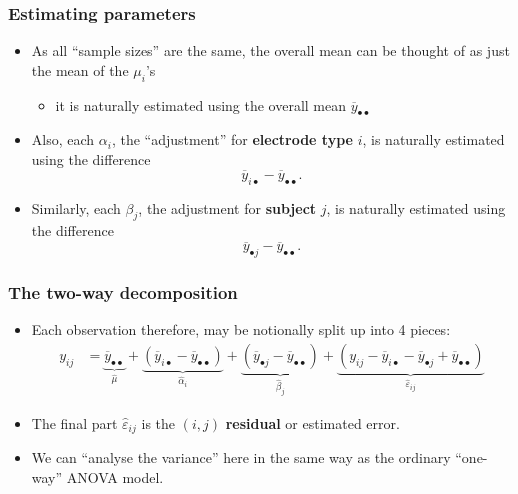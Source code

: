 \documentclass[a4paper]{article}
\begin{document}
\subsubsection{Estimating parameters}
\begin{itemize}
	\item As all ``sample sizes'' are the same, the overall mean can be thought of as just the mean of the \( \mu_i \)'s
	\begin{itemize}
		\item it is naturally estimated using the overall mean \( \overline{y}_{\bullet\bullet} \) 
	\end{itemize}
	\item Also, each \( \alpha_i \), the ``adjustment'' for \textcolor{mygreen}{\textbf{electrode type}} \( i \), is naturally estimated using the difference
	\[
		\overline{y}_{i\bullet} - \overline{y}_{\bullet\bullet}.
	\]
	\item Similarly, each \( \beta_j \), the adjustment for \textcolor{myred}{\textbf{subject}} \( j \), is naturally estimated using the difference
	\[
			\overline{y}_{\bullet j} - \overline{y}_{\bullet\bullet}.
	\]
\end{itemize}
\subsubsection{The two-way decomposition}
\begin{itemize}
	\item Each observation therefore, may be notionally split up into 4 pieces:
	\begin{align*}
		y_{ij}&= \underbrace{\overline y_{\bullet\bullet}}_{\hat\mu}+ \underbrace{(\overline y_{i\bullet}-\overline y_{\bullet\bullet})}_{\hat\alpha_i} + \underbrace{(\overline y_{\bullet j}-\overline y_{\bullet\bullet})}_{\hat\beta_j} + \underbrace{(y_{ij}-\overline y_{i\bullet}-\overline y_{\bullet j}+\overline y_{\bullet\bullet})}_{\hat\varepsilon_{ij}}
	\end{align*}
	\item The final part \( \hat{\varepsilon}_{ij} \) is the \( (i,j) \) \textbf{residual} or estimated error.
	\item We can ``analyse the variance'' here in the same way as the ordinary ``one-way'' ANOVA model.
\end{itemize}
\end{document}
